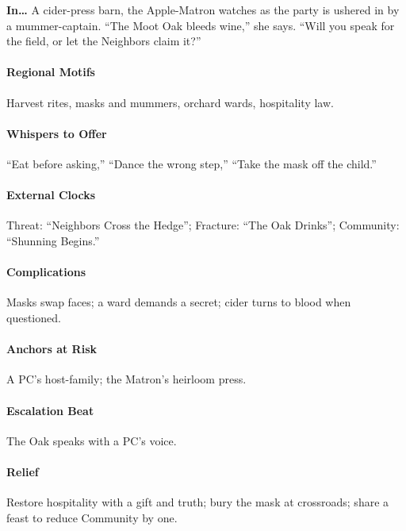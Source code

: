 \textbf{In…} A cider-press barn, the Apple-Matron watches as the party is ushered in by a mummer-captain. ``The Moot Oak bleeds wine,'' she says. ``Will you speak for the field, or let the Neighbors claim it?''
\paragraph{Regional Motifs} Harvest rites, masks and mummers, orchard wards, hospitality law.
\paragraph{Whispers to Offer} ``Eat before asking,'' ``Dance the wrong step,'' ``Take the mask off the child.''
\paragraph{External Clocks} Threat: ``Neighbors Cross the Hedge''; Fracture: ``The Oak Drinks''; Community: ``Shunning Begins.''
\paragraph{Complications} Masks swap faces; a ward demands a secret; cider turns to blood when questioned.
\paragraph{Anchors at Risk} A PC’s host-family; the Matron’s heirloom press.
\paragraph{Escalation Beat} The Oak speaks with a PC’s voice.
\paragraph{Relief} Restore hospitality with a gift and truth; bury the mask at crossroads; share a feast to reduce Community by one.


